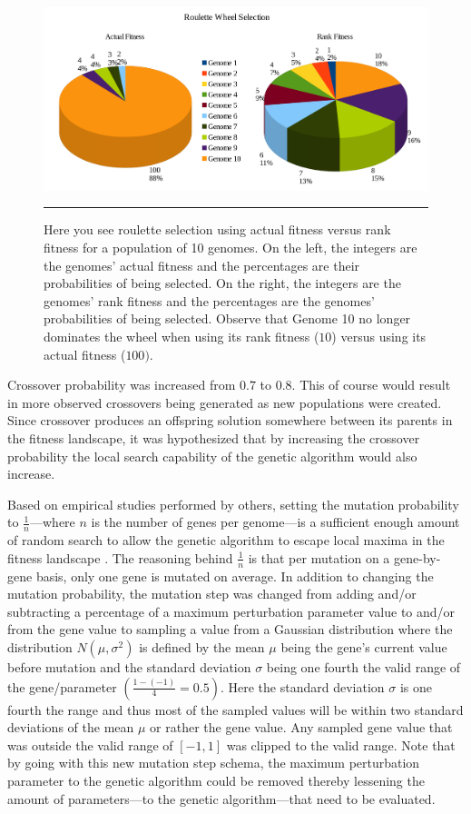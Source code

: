 \begin{figure}[htbp]  
  \centering
  \includegraphics[scale=0.25]{../Figures/Chapter3/roulette.png}
  \rule{35em}{0.5pt}
  \caption[Roulette Wheel Selection]{Here you see roulette selection using actual fitness versus rank fitness for a population of 10 genomes. On the left, the integers are the genomes' actual fitness and the percentages are their probabilities of being selected. On the right, the integers are the genomes' rank fitness and the percentages are the genomes' probabilities of being selected. Observe that Genome 10 no longer dominates the wheel when using its rank fitness ($10$) versus using its actual fitness ($100)$.}
  \label{fig:roulette}
\end{figure}

Crossover probability was increased from $0.7$ to $0.8$. This of course would result in more observed crossovers being generated as new populations were created. Since crossover produces an offspring solution  somewhere between its parents in the fitness landscape, it was hypothesized that by increasing the crossover probability the local search capability of the genetic algorithm would also increase.

Based on empirical studies performed by others, setting the mutation probability to $\frac{1}{n}$---where $n$ is the number of genes per genome---is a sufficient enough amount of random search to allow the genetic algorithm to escape local maxima in the fitness landscape \cite{predictive_models}. The reasoning behind $\frac{1}{n}$ is that per mutation on a gene-by-gene basis, only one gene is mutated on average. In addition to changing the mutation probability, the mutation step was changed from adding and/or subtracting a percentage of a maximum perturbation parameter value to and/or from the gene value to sampling a value from a Gaussian distribution where the distribution $N(\mu,\sigma^2)$ is defined by the mean $\mu$ being the gene's current value before mutation and the standard deviation $\sigma$ being one fourth the valid range of the gene/parameter $\left(\frac{1-(-1)}{4}=0.5 \right)$. Here the standard deviation $\sigma$ is one fourth the range and thus most of the sampled values will be within two standard deviations of the mean $\mu$ or rather the gene value. Any sampled gene value that was outside the valid range of $[-1,1]$ was clipped to the valid range. Note that by going with this new mutation step schema, the maximum perturbation parameter to the genetic algorithm could be removed thereby lessening the amount of parameters---to the genetic algorithm---that need to be evaluated. 

